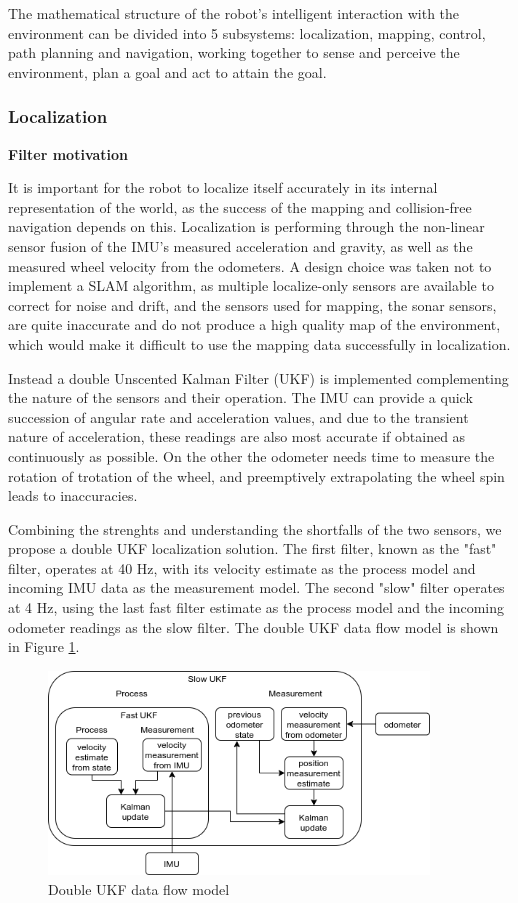 The mathematical structure of the robot's intelligent interaction with the environment can be divided into 5 subsystems: localization, mapping, control, path planning and navigation, working together to sense and perceive the environment, plan a goal and act to attain the goal.

\subsubsection{Localization}
\label{sec:localize}

\textbf{Filter motivation}

It is important for the robot to localize itself accurately in its internal representation of the world, as the success of the mapping and collision-free navigation depends on this. Localization is performing through the non-linear sensor fusion of the IMU's measured acceleration and gravity, as well as the measured wheel velocity from the odometers. A design choice was taken not to implement a SLAM algorithm, as multiple localize-only sensors are available to correct for noise and drift, and the sensors used for mapping, the sonar sensors, are quite inaccurate and do not produce a high quality map of the environment, which would make it difficult to use the mapping data successfully in localization. 

Instead a double Unscented Kalman Filter (UKF) is implemented complementing the nature of the sensors and their operation. The IMU can provide a quick succession of angular rate and acceleration values, and due to the transient nature of acceleration, these readings are also most accurate if obtained as continuously as possible. On the other the odometer needs time to measure the rotation of trotation of the wheel, and preemptively extrapolating the wheel spin leads to inaccuracies. 

Combining the strenghts and understanding the shortfalls of the two sensors, we propose a double UKF localization solution. The first filter, known as the "fast" filter, operates at 40 Hz, with its velocity estimate as the process model and incoming IMU data as the measurement model. The second "slow" filter operates at 4 Hz, using the last fast filter estimate as the process model and the incoming odometer readings as the slow filter. The double UKF data flow model is shown in Figure \ref{fig:dukf}.

\begin{figure}
    \centering
    \includegraphics[width=0.9\textwidth]{figures/dukf.png}
    \caption{Double UKF data flow model}
    \label{fig:dukf}
\end{figure}

